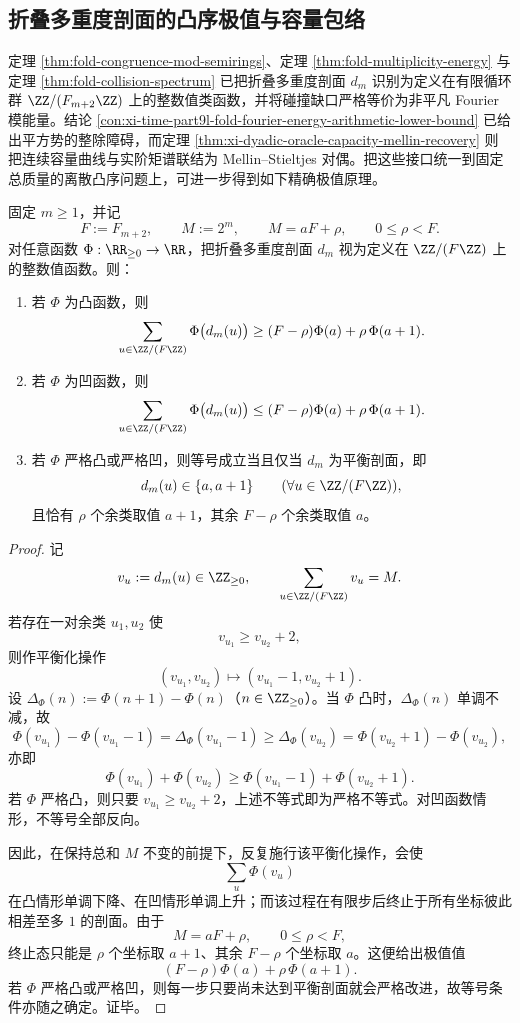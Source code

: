 \subsection{折叠多重度剖面的凸序极值与容量包络}

定理 \ref{thm:fold-congruence-mod-semirings}、定理 \ref{thm:fold-multiplicity-energy} 与定理 \ref{thm:fold-collision-spectrum} 已把折叠多重度剖面 \(d_m\) 识别为定义在有限循环群 \(\ZZ/(F_{m+2}\ZZ)\) 上的整数值类函数，并将碰撞缺口严格等价为非平凡 Fourier 模能量。结论 \ref{con:xi-time-part9l-fold-fourier-energy-arithmetic-lower-bound} 已给出平方势的整除障碍，而定理 \ref{thm:xi-dyadic-oracle-capacity-mellin-recovery} 则把连续容量曲线与实阶矩谱联结为 Mellin--Stieltjes 对偶。把这些接口统一到固定总质量的离散凸序问题上，可进一步得到如下精确极值原理。

\begin{theorem}[折叠多重度剖面的精确凸序极值原理]\label{thm:derived-fold-multiplicity-convex-order-extremal}
固定 \(m\ge 1\)，并记
\[
F:=F_{m+2},
\qquad
M:=2^m,
\qquad
M=aF+\rho,
\qquad
0\le \rho<F.
\]
对任意函数 \(\Phi:\RR_{\ge 0}\to \RR\)，把折叠多重度剖面 \(d_m\) 视为定义在 \(\ZZ/(F\ZZ)\) 上的整数值函数。则：
\begin{enumerate}
  \item 若 \(\Phi\) 为凸函数，则
  \[
  \sum_{u\in \ZZ/(F\ZZ)}\Phi\bigl(d_m(u)\bigr)
  \ge
  (F-\rho)\Phi(a)+\rho\,\Phi(a+1).
  \]
  \item 若 \(\Phi\) 为凹函数，则
  \[
  \sum_{u\in \ZZ/(F\ZZ)}\Phi\bigl(d_m(u)\bigr)
  \le
  (F-\rho)\Phi(a)+\rho\,\Phi(a+1).
  \]
  \item 若 \(\Phi\) 严格凸或严格凹，则等号成立当且仅当 \(d_m\) 为平衡剖面，即
  \[
  d_m(u)\in\{a,a+1\}\qquad (\forall u\in \ZZ/(F\ZZ)),
  \]
  且恰有 \(\rho\) 个余类取值 \(a+1\)，其余 \(F-\rho\) 个余类取值 \(a\)。
\end{enumerate}
\end{theorem}
\begin{proof}
记
\[
v_u:=d_m(u)\in \ZZ_{\ge 0},
\qquad
\sum_{u\in \ZZ/(F\ZZ)}v_u=M.
\]
若存在一对余类 \(u_1,u_2\) 使
\[
v_{u_1}\ge v_{u_2}+2,
\]
则作平衡化操作
\[
(v_{u_1},v_{u_2})\longmapsto (v_{u_1}-1,v_{u_2}+1).
\]
设 \(\Delta_\Phi(n):=\Phi(n+1)-\Phi(n)\)（\(n\in\ZZ_{\ge 0}\)）。当 \(\Phi\) 凸时，\(\Delta_\Phi(n)\) 单调不减，故
\[
\Phi(v_{u_1})-\Phi(v_{u_1}-1)
=
\Delta_\Phi(v_{u_1}-1)
\ge
\Delta_\Phi(v_{u_2})
=
\Phi(v_{u_2}+1)-\Phi(v_{u_2}),
\]
亦即
\[
\Phi(v_{u_1})+\Phi(v_{u_2})
\ge
\Phi(v_{u_1}-1)+\Phi(v_{u_2}+1).
\]
若 \(\Phi\) 严格凸，则只要 \(v_{u_1}\ge v_{u_2}+2\)，上述不等式即为严格不等式。对凹函数情形，不等号全部反向。

因此，在保持总和 \(M\) 不变的前提下，反复施行该平衡化操作，会使
\[
\sum_u \Phi(v_u)
\]
在凸情形单调下降、在凹情形单调上升；而该过程在有限步后终止于所有坐标彼此相差至多 \(1\) 的剖面。由于
\[
M=aF+\rho,
\qquad
0\le \rho<F,
\]
终止态只能是 \(\rho\) 个坐标取 \(a+1\)、其余 \(F-\rho\) 个坐标取 \(a\)。这便给出极值值
\[
(F-\rho)\Phi(a)+\rho\,\Phi(a+1).
\]
若 \(\Phi\) 严格凸或严格凹，则每一步只要尚未达到平衡剖面就会严格改进，故等号条件亦随之确定。证毕。
\end{proof}

